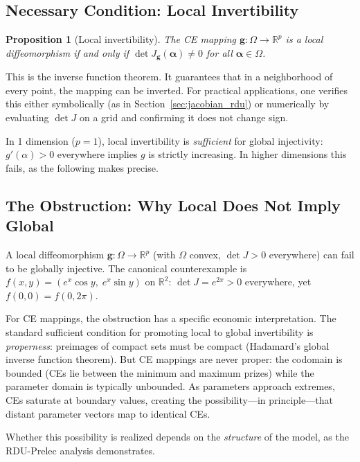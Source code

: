 \documentclass[11pt,a4paper]{article}
\newtheorem{proposition}[theorem]{Proposition}
\theoremstyle{definition}
\begin{document}
\subsection{Necessary Condition: Local Invertibility}

\begin{proposition}[Local invertibility]
\label{prop:local}
The CE mapping $\mathbf{g}: \Omega \to \mathbb{R}^p$ is a local
diffeomorphism if and only if $\det J_{\mathbf{g}}(\bm{\alpha}) \neq 0$ for
all $\bm{\alpha} \in \Omega$.
\end{proposition}

This is the inverse function theorem. It guarantees that in a neighborhood of
every point, the mapping can be inverted. For practical applications, one
verifies this either symbolically (as in Section~\ref{sec:jacobian_rdu}) or
numerically by evaluating $\det J$ on a grid and confirming it does not change
sign.

In 1 dimension ($p = 1$), local invertibility is \emph{sufficient} for global
injectivity: $g'(\alpha) > 0$ everywhere implies $g$ is strictly increasing.
In higher dimensions this fails, as the following makes precise.

\subsection{The Obstruction: Why Local Does Not Imply Global}
\label{sec:obstruction}

A local diffeomorphism $\mathbf{g}: \Omega \to \mathbb{R}^p$ (with $\Omega$
convex, $\det J > 0$ everywhere) can fail to be globally injective. The
canonical counterexample is $f(x,y) = (e^x \cos y,\; e^x \sin y)$ on
$\mathbb{R}^2$: $\det J = e^{2x} > 0$ everywhere, yet
$f(0, 0) = f(0, 2\pi)$.

For CE mappings, the obstruction has a specific economic interpretation.
The standard sufficient condition for promoting local to global invertibility
is \emph{properness}: preimages of compact sets must be compact (Hadamard's
global inverse function theorem). But CE mappings are never proper: the
codomain is bounded (CEs lie between the minimum and maximum prizes) while the
parameter domain is typically unbounded. As parameters approach extremes, CEs
saturate at boundary values, creating the possibility---in principle---that
distant parameter vectors map to identical CEs.

Whether this possibility is realized depends on the \emph{structure} of the
model, as the RDU-Prelec analysis demonstrates.
\end{document}
